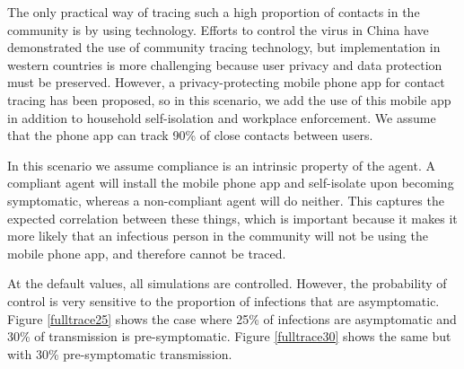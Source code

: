 \documentclass{article}
\begin{document}
The only practical way of tracing such a high proportion of contacts in the community is by using technology. Efforts to control the virus in China have demonstrated the use of community tracing technology, but implementation in western countries is more challenging because user privacy and data protection must be preserved. However, a privacy-protecting mobile phone app for contact tracing has been proposed\cite{tang2020Mobile}, so in this scenario, we add the use of this mobile app in addition to household self-isolation and workplace enforcement. We assume that the phone app can track 90\% of close contacts between users.

In this scenario we assume compliance is an intrinsic property of the agent. A compliant agent will install the mobile phone app and self-isolate upon becoming symptomatic, whereas a non-compliant agent will do neither. This captures the expected correlation between these things, which is important because it makes it more likely that an infectious person in the community will not be using the mobile phone app, and therefore cannot be traced.

At the default values, all simulations are controlled. However, the probability of control is very sensitive to the proportion of infections that are asymptomatic. Figure \ref{fulltrace25} shows the case where 25\% of infections are asymptomatic and 30\% of transmission is pre-symptomatic. Figure \ref{fulltrace30} shows the same but with 30\% pre-symptomatic transmission.
\end{document}
